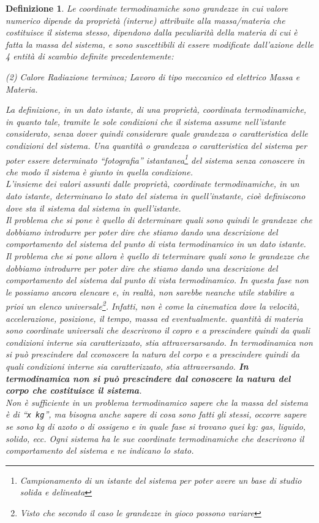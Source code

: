 \documentclass{book}
\newtheorem{defi}{Definizione}
\begin{document}
\begin{defi}
  Le coordinate termodinamiche sono grandezze in cui valore numerico dipende da proprietà ({\it interne})
  attribuite alla massa/materia che costituisce il sistema stesso, dipendono dalla peculiarità della materia
  di cui è fatta la massa del sistema, e sono suscettibili di essere modificate dall'azione delle 4 entità
  di scambio definite precedentemente:
  \begin{tasks}(2)
    \task Calore
    \task Radiazione terminca;
    \task Lavoro di tipo meccanico ed elettrico
    \task Massa e Materia.
  \end{tasks}
  La definizione, in un dato istante, di una proprietà, coordinata termodinamiche, in quanto tale, tramite le
  sole condizioni che il sistema assume nell'istante considerato, senza dover quindi considerare quale grandezza
  o caratteristica delle condizioni del sistema. Una quantità o grandezza o caratteristica del sistema per
  poter essere determinato ``fotografia'' istantanea\footnote{Campionamento di un istante del sistema
    per poter avere un base di studio solida e delineata} del sistema senza conoscere in che modo il sistema
  è giunto in quella condizione.\\
  L'insieme dei valori assunti dalle proprietà, coordinate termodinamiche, in un dato istante, determinano lo
  stato del sistema in quell'instante, cioè definiscono dove sta il sistema dal sistema in quell'istante.\\
  Il problema che si pone è quello di determinare quali sono quindi le grandezze che dobbiamo introdurre per
  poter dire che stiamo dando una descrizione del comportamento del sistema del punto di vista termodinamico in
  un dato istante.\\
  Il problema che si pone allora è quello di teterminare quali sono le grandezze che dobbiamo introdurre
  per poter dire che stiamo dando una descrizione del comportamento del sistema dal punto di vista termodinamico.
  In questa fase non le possiamo ancora elencare e, in realtà, non sarebbe neanche utile stabilire a prioi un
  elenco universale\footnote{Visto che secondo il caso le grandezze in gioco possono variare}. Infatti, non è come
  la cinematica dove la velocità, accelerazione, posizione, il tempo, massa ed eventualmente. quantità di materia
  sono coordinate universali che descrivono il copro e a prescindere quindi da quali condizioni interne sia
  caratterizzato, stia attraversarsando. In termodinamica non si può prescindere dal cconoscere la natura del
  corpo e a prescindere quindi da quali condizioni interne sia caratterizzato, stia attraversando. {\bf In
    termodinamica non si può prescindere dal conoscere la natura del corpo che costituisce il sistema}.\\
  Non è sufficiente in un problema termodinamico sapere che la massa del sistema è di ``{\tt x kg}'', ma bisogna anche
  sapere di cosa sono fatti gli stessi, occorre sapere se sono kg di azoto o di ossigeno e in quale fase si
  trovano quei kg: gas, liguido, solido, ecc. Ogni sistema ha le sue coordinate termodinamiche che descrivono il
  comportamento del sistema e ne indicano lo stato.
\end{defi}
\clearpage
\end{document}
